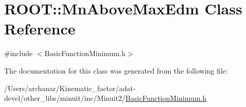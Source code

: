 \hypertarget{classROOT_1_1Minuit2_1_1BasicFunctionMinimum_1_1MnAboveMaxEdm}{}\section{R\+O\+OT\+:\+:Mn\+Above\+Max\+Edm Class Reference}
\label{classROOT_1_1Minuit2_1_1BasicFunctionMinimum_1_1MnAboveMaxEdm}


{\ttfamily \#include $<$Basic\+Function\+Minimum.\+h$>$}



The documentation for this class was generated from the following file\+:\begin{DoxyCompactItemize}
\item 
/\+Users/archanar/\+Kinematic\+\_\+factor/adat-\/devel/other\+\_\+libs/minuit/inc/\+Minuit2/\mbox{\hyperlink{adat-devel_2other__libs_2minuit_2inc_2Minuit2_2BasicFunctionMinimum_8h}{Basic\+Function\+Minimum.\+h}}\end{DoxyCompactItemize}
